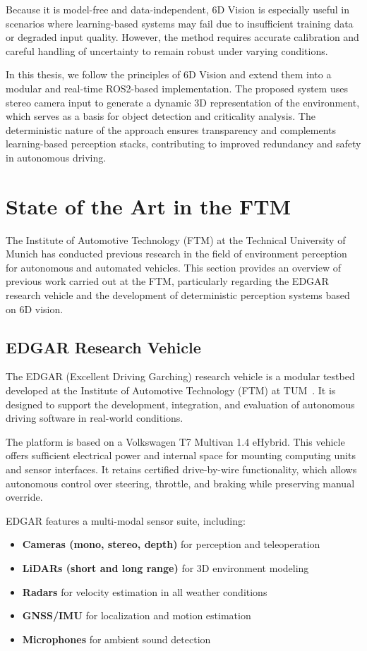 Because it is model-free and data-independent, 6D Vision is especially useful in scenarios where learning-based 
systems may fail due to insufficient training data or degraded input quality. However, the method requires 
accurate calibration and careful handling of uncertainty to remain robust under varying conditions.

In this thesis, we follow the principles of 6D Vision and extend them into a modular and real-time 
ROS2-based implementation. The proposed system uses stereo camera input to generate a dynamic 3D 
representation of the environment, which serves as a basis for object detection and criticality analysis. 
The deterministic nature of the approach ensures transparency and complements learning-based 
perception stacks, contributing to improved redundancy and safety in autonomous driving.

\section{State of the Art in the FTM}\label{sec:StateOfTheArtInTheFTM}


The Institute of Automotive Technology (FTM) at the Technical University of Munich has conducted previous research in
the field of environment perception for autonomous and automated vehicles. This section provides an overview of previous work carried 
out at the FTM, particularly regarding the EDGAR research vehicle and the development of deterministic perception systems based on 6D vision.

\subsection{EDGAR Research Vehicle}

The EDGAR (Excellent Driving Garching) research vehicle is a modular testbed 
developed at the Institute of Automotive Technology (FTM) at TUM~\cite{edgar_hardware}. It is designed to support the development, integration, 
and evaluation of autonomous driving software in real-world conditions.

The platform is based on a Volkswagen T7 Multivan 1.4 eHybrid. This vehicle 
offers sufficient electrical power and internal space for mounting computing 
units and sensor interfaces. It retains certified drive-by-wire functionality, 
which allows autonomous control over steering, throttle, and braking while 
preserving manual override.

EDGAR features a multi-modal sensor suite, including:
\begin{itemize}
  \item \textbf{Cameras (mono, stereo, depth)} for perception and teleoperation
  \item \textbf{LiDARs (short and long range)} for 3D environment modeling
  \item \textbf{Radars} for velocity estimation in all weather conditions
  \item \textbf{GNSS/IMU} for localization and motion estimation
  \item \textbf{Microphones} for ambient sound detection
\end{itemize}

